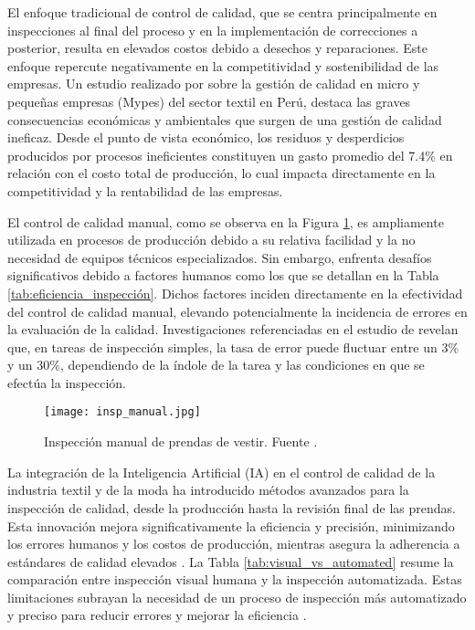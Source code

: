 El enfoque tradicional de control de calidad, que se centra principalmente en inspecciones al final del proceso y en la implementación de correcciones a posterior, resulta en elevados costos debido a desechos y reparaciones. Este enfoque repercute negativamente en la competitividad y sostenibilidad de las empresas. Un estudio realizado por \cite{BonillaPastor2015} sobre la gestión de calidad en micro y pequeñas empresas (Mypes) del sector textil en Perú, destaca las graves consecuencias económicas y ambientales que surgen de una gestión de calidad ineficaz. Desde el punto de vista económico, los residuos y desperdicios producidos por procesos ineficientes constituyen un gasto promedio del 7.4\% en relación con el costo total de producción, lo cual impacta directamente en la competitividad y la rentabilidad de las empresas.

El control de calidad manual, como se observa en la Figura \ref{fig:insp_manual}, es ampliamente utilizada en procesos de producción debido a su relativa facilidad y la no necesidad de equipos técnicos especializados. Sin embargo, enfrenta desafíos significativos debido a factores humanos como los que se detallan en la Tabla \ref{tab:eficiencia_inspección}. Dichos factores inciden directamente en la efectividad del control de calidad manual, elevando potencialmente la incidencia de errores en la evaluación de la calidad. Investigaciones referenciadas en el estudio de \cite{KujawinskaVogt2015} revelan que, en tareas de inspección simples, la tasa de error puede fluctuar entre un 3\% y un 30\%, dependiendo de la índole de la tarea y las condiciones en que se efectúa la inspección.

\begin{figure}[H]
	\centering
	\texttt{[image: insp\_manual.jpg]}
	\caption[Inspección manual de prendas de vestir.]{Inspección manual de prendas de vestir. Fuente \cite{qimaProcedimientosInspeccin}.}
	\label{fig:insp_manual}
\end{figure}

La integración de la Inteligencia Artificial (IA) en el control de calidad de la industria textil y de la moda ha introducido métodos avanzados para la inspección de calidad, desde la producción hasta la revisión final de las prendas. Esta innovación mejora significativamente la eficiencia y precisión, minimizando los errores humanos y los costos de producción, mientras asegura la adherencia a estándares de calidad elevados \cite{TextileLearner}. La Tabla \ref{tab:visual_vs_automated} resume la comparación entre inspección visual humana y la inspección automatizada. Estas limitaciones subrayan la necesidad de un proceso de inspección más automatizado y preciso para reducir errores y mejorar la eficiencia \cite{Islam2006ASuitable}.

